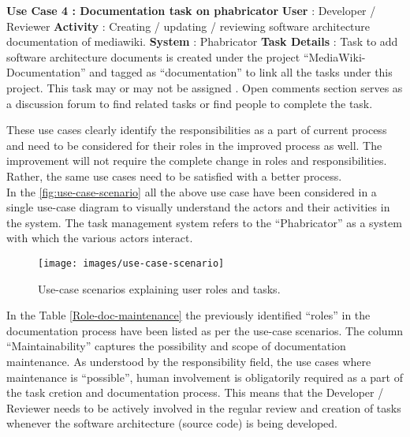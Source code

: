 \begin{mdframed}[leftmargin=10pt,rightmargin=10pt]
\textbf{Use Case 4 : Documentation task on phabricator}
\newline \newline \indent \textbf{User} : Developer / Reviewer
\newline \newline \indent \textbf{Activity} : Creating / updating / reviewing software architecture documentation of mediawiki.
\newline \newline \indent \textbf{System} : Phabricator
\newline \newline \indent \textbf{Task Details} : Task to add software architecture documents is created under the project \enquote{MediaWiki-Documentation} \cite{MW_doc_phab} and tagged as \enquote{documentation} to link all the tasks under this project. This task may or may not be assigned . Open comments section serves as a discussion forum to find related tasks or find people to complete the task.
\end{mdframed}
These use cases clearly identify the responsibilities as a part of current process and need to be considered for their roles in the improved process as well. The improvement will not require the complete change in roles and responsibilities. Rather, the same use cases need to be satisfied with a better process.
\newline
\\\indent In the \autoref{fig:use-case-scenario} all the above use case have been considered in a single use-case diagram to visually understand the actors and their activities in the system. The task management system refers to the \enquote{Phabricator} as a system with which the various actors interact.

\begin{figure}[H]
  \centering
  \texttt{[image: images/use-case-scenario]}
  \caption[Use-case scenarios explaining user roles and tasks]{Use-case scenarios explaining user roles and tasks.}\label{fig:use-case-scenario}
\end{figure}

In the Table \autoref{Role-doc-maintenance} the previously identified \enquote{roles} in the documentation process have been listed as per the use-case scenarios. The column \enquote{Maintainability} captures the possibility and scope of documentation maintenance. As understood by the responsibility field, the use cases where maintenance is \enquote{possible}, human involvement is obligatorily required as a part of the task cretion and documentation process. This means that the Developer / Reviewer needs to be actively involved in the regular review and creation of tasks whenever the software architecture (source code) is being developed.

